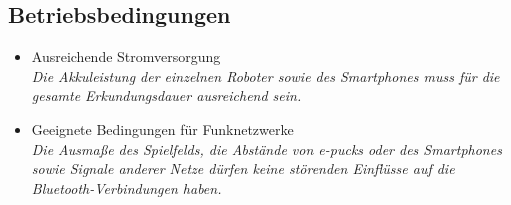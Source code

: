 \documentclass[10pt,a4paper]{article}
\begin{document}
		\subsection{Betriebsbedingungen}
			\begin{itemize}
				\item Ausreichende Stromversorgung
					\\ \textsl{ Die Akkuleistung der einzelnen Roboter sowie des Smartphones muss für die gesamte
						Erkundungsdauer ausreichend sein.}
				\item Geeignete Bedingungen für Funknetzwerke
					\\ \textsl{ Die Ausmaße des Spielfelds, die Abstände von e-pucks oder des Smartphones sowie
						Signale anderer Netze dürfen keine störenden Einflüsse auf die Bluetooth-Verbindungen haben.}
			\end{itemize}
\end{document}
